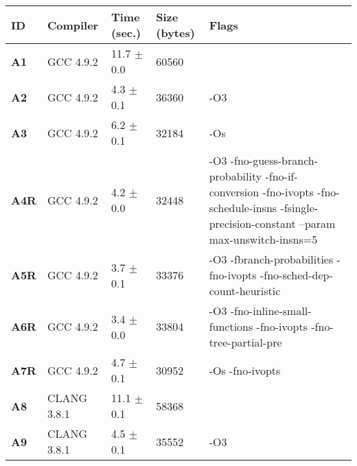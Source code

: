     \begin{tabular}{|l|l|l|l|p{3.2in}|}
     \hline
      \textbf{ID} & \textbf{Compiler} & \textbf{Time (sec.)} & \textbf{Size (bytes)} & \textbf{Flags} \\ 
     \hline
      \textbf{ A1 } &  GCC 4.9.2  &  11.7 $\pm$ 0.0  &  60560  & {\small  }\\
     \hline
      \textbf{ A2 } &  GCC 4.9.2  &  4.3 $\pm$ 0.1  &  36360  & {\small -O3 }\\
     \hline
      \textbf{ A3 } &  GCC 4.9.2  &  6.2 $\pm$ 0.1  &  32184  & {\small -Os }\\
     \hline
      \textbf{ A4R } &  GCC 4.9.2  &  4.2 $\pm$ 0.0  &  32448  & {\small -O3 -fno-guess-branch-probability -fno-if-conversion -fno-ivopts -fno-schedule-insns -fsingle-precision-constant --param max-unswitch-insns=5 }\\
     \hline
      \textbf{ A5R } &  GCC 4.9.2  &  3.7 $\pm$ 0.1  &  33376  & {\small -O3 -fbranch-probabilities -fno-ivopts -fno-sched-dep-count-heuristic }\\
     \hline
      \textbf{ A6R } &  GCC 4.9.2  &  3.4 $\pm$ 0.0  &  33804  & {\small -O3 -fno-inline-small-functions -fno-ivopts -fno-tree-partial-pre }\\
     \hline
      \textbf{ A7R } &  GCC 4.9.2  &  4.7 $\pm$ 0.1  &  30952  & {\small -Os -fno-ivopts }\\
     \hline
      \textbf{ A8 } &  CLANG 3.8.1  &  11.1 $\pm$ 0.1  &  58368  & {\small  }\\
     \hline
      \textbf{ A9 } &  CLANG 3.8.1  &  4.5 $\pm$ 0.1  &  35552  & {\small -O3 }\\
     \hline
    \end{tabular}    